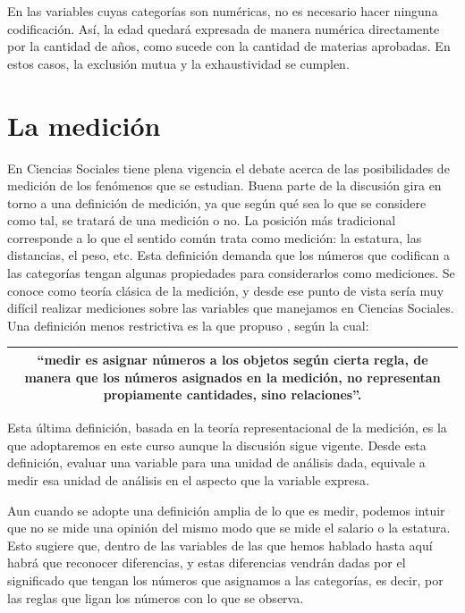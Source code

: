 \documentclass[]{book}
\begin{document}
En las variables cuyas categorías son numéricas, no es necesario hacer ninguna codificación. Así, la edad quedará expresada de manera numérica directamente por la cantidad de años, como sucede con la cantidad de materias aprobadas. En estos casos, la exclusión mutua y la exhaustividad se cumplen.

\hypertarget{la-mediciuxf3n}{%
\section{La medición}\label{la-mediciuxf3n}}

En Ciencias Sociales tiene plena vigencia el debate acerca de las posibilidades de medición de los fenómenos que se estudian. Buena parte de la discusión gira en torno a una definición de medición, ya que según qué sea lo que se considere como tal, se tratará de una medición o no. La posición más tradicional corresponde a lo que el sentido común trata como medición: la estatura, las distancias, el peso, etc. Esta definición demanda que los números que codifican a las categorías tengan algunas propiedades para considerarlos como mediciones. Se conoce como teoría clásica de la medición, y desde ese punto de vista sería muy difícil realizar mediciones sobre las variables que manejamos en Ciencias Sociales. Una definición menos restrictiva es la que propuso \citet{Stevens1946}, según la cual:

\begin{longtable}[]{@{}c@{}}
\toprule
\endhead
\begin{minipage}[t]{0.97\columnwidth}\centering
``medir es asignar números a los objetos según cierta regla, de manera que los números asignados en la medición, no representan propiamente cantidades, sino relaciones''.\strut
\end{minipage}\tabularnewline
\bottomrule
\end{longtable}

Esta última definición, basada en la teoría representacional de la medición, es la que adoptaremos en este curso aunque la discusión sigue vigente. Desde esta definición, evaluar una variable para una unidad de análisis dada, equivale a medir esa unidad de análisis en el aspecto que la variable expresa.

Aun cuando se adopte una definición amplia de lo que es medir, podemos intuir que no se mide una opinión del mismo modo que se mide el salario o la estatura. Esto sugiere que, dentro de las variables de las que hemos hablado hasta aquí habrá que reconocer diferencias, y estas diferencias vendrán dadas por el significado que tengan los números que asignamos a las categorías, es decir, por las reglas que ligan los números con lo que se observa.
\end{document}
